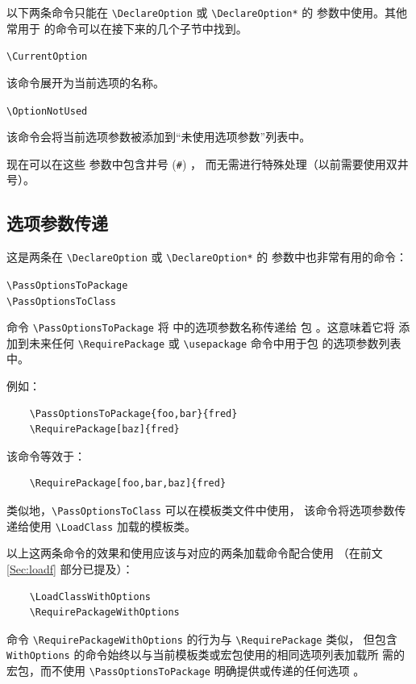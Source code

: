 \documentclass{ltxguide}[1995/11/28]
\begin{document}
以下两条命令只能在 \verb|\DeclareOption| 或 \verb|\DeclareOption*| 的 
参数中使用。其他常用于  的命令可以在接下来的几个子节中找到。

\begin{decl}
	\verb|\CurrentOption|
\end{decl}
该命令展开为当前选项的名称。

\begin{decl}
	\verb|\OptionNotUsed|
\end{decl}
该命令会将当前选项参数被添加到“未使用选项参数”列表中。

现在可以在这些  参数中包含井号 (\texttt{\#}) ，
而无需进行特殊处理（以前需要使用双井号）。

\subsection{选项参数传递}
\label{Sec:opmove}

这是两条在 \verb|\DeclareOption| 或 \verb|\DeclareOption*|
的  参数中也非常有用的命令：
\begin{decl}
	\verb|\PassOptionsToPackage|  \\
	\verb|\PassOptionsToClass|  
\end{decl}
命令 \verb|\PassOptionsToPackage| 将  中的选项参数名称传递给
包 。这意味着它将  添加到未来任何
\verb|\RequirePackage| 或 \verb|\usepackage| 命令中用于包 
的选项参数列表中。

例如：
\begin{verbatim}
	\PassOptionsToPackage{foo,bar}{fred}
	\RequirePackage[baz]{fred}
\end{verbatim}
该命令等效于：
\begin{verbatim}
	\RequirePackage[foo,bar,baz]{fred}
\end{verbatim}

类似地，\verb|\PassOptionsToClass| 可以在模板类文件中使用，
该命令将选项参数传递给使用 \verb|\LoadClass| 加载的模板类。

以上这两条命令的效果和使用应该与对应的两条加载命令配合使用
（在前文 \ref{Sec:loadf} 部分已提及）：
\begin{verbatim}
	\LoadClassWithOptions
	\RequirePackageWithOptions
\end{verbatim}
命令 \verb|\RequirePackageWithOptions| 的行为与 \verb|\RequirePackage| 类似，
但包含 \verb|WithOptions| 的命令始终以与当前模板类或宏包使用的相同选项列表加载所
需的宏包，而不使用 \verb|\PassOptionsToPackage| 明确提供或传递的任何选项
。%
\end{document}
